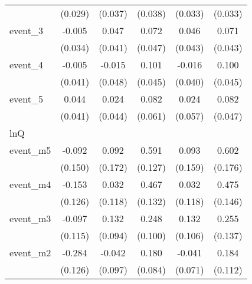 {\begin{tabular}{l*{5}{c}}
            &     (0.029)         &     (0.037)         &     (0.038)         &     (0.033)         &     (0.033)         \\
[1em]
event\_3     &      -0.005         &       0.047         &       0.072         &       0.046         &       0.071         \\
            &     (0.034)         &     (0.041)         &     (0.047)         &     (0.043)         &     (0.043)         \\
[1em]
event\_4     &      -0.005         &      -0.015         &       0.101\sym{*}  &      -0.016         &       0.100\sym{*}  \\
            &     (0.041)         &     (0.048)         &     (0.045)         &     (0.040)         &     (0.045)         \\
[1em]
event\_5     &       0.044         &       0.024         &       0.082         &       0.024         &       0.082         \\
            &     (0.041)         &     (0.044)         &     (0.061)         &     (0.057)         &     (0.047)         \\
\hline
lnQ         &                     &                     &                     &                     &                     \\
event\_m5    &      -0.092         &       0.092         &       0.591\sym{***}&       0.093         &       0.602\sym{***}\\
            &     (0.150)         &     (0.172)         &     (0.127)         &     (0.159)         &     (0.176)         \\
[1em]
event\_m4    &      -0.153         &       0.032         &       0.467\sym{***}&       0.032         &       0.475\sym{**} \\
            &     (0.126)         &     (0.118)         &     (0.132)         &     (0.118)         &     (0.146)         \\
[1em]
event\_m3    &      -0.097         &       0.132         &       0.248\sym{*}  &       0.132         &       0.255         \\
            &     (0.115)         &     (0.094)         &     (0.100)         &     (0.106)         &     (0.137)         \\
[1em]
event\_m2    &      -0.284\sym{*}  &      -0.042         &       0.180\sym{*}  &      -0.041         &       0.184         \\
            &     (0.126)         &     (0.097)         &     (0.084)         &     (0.071)         &     (0.112)         \\

\end{tabular}}
